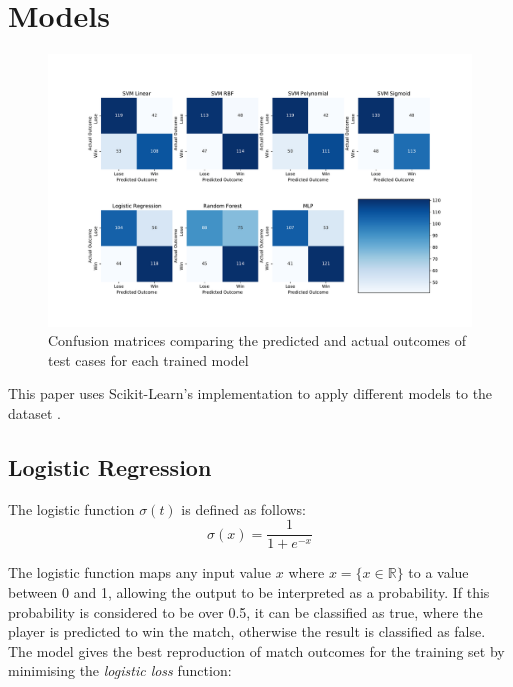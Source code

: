 \section{Models} \label{sec:models}
\begin{figure}[ht]

\centering
\includegraphics[width=\textwidth]{plots/confusionmatrices.pdf}
\vspace{-2em}

\caption{Confusion matrices comparing the predicted and actual outcomes of test cases for each trained model }

\label{fig:confusionmatricesr2}
\centering
\end{figure}



This paper uses Scikit-Learn's implementation to apply different models to the dataset \cite{pedregosa2011scikit}.

\subsection{Logistic Regression}
The logistic function $\sigma(t)$ is defined as follows:
\begin{equation}
    \sigma(x) = \frac{1}{1+e^{-x}}
\end{equation}

The logistic function maps any input value $x$ where $x = \{x\in \mathbb{R} \}$ to a value between 0 and 1, allowing the output to be interpreted as a probability. If this probability is considered to be over 0.5, it can be classified as true, where the player is predicted to win the match, otherwise the result is classified as false. The model gives the best reproduction of match outcomes for the training set by minimising the \textit{logistic loss} function:

